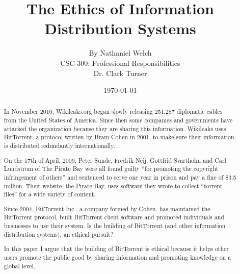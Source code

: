 \documentclass[11pt]{article}
\begin{document}
\title{\vfill The Ethics of Information Distribution Systems} %
\author{
By Nathaniel Welch\vspace{10pt}\\
CSC 300: Professional Responsibilities\vspace{10pt}\\
Dr. Clark Turner\vspace{10pt}\\
}
\date{\today}

\maketitle

\vfill
\begin{abstract}
In November 2010, Wikileaks.org began slowly releasing 251,287 diplomatic cables from the United States of America. \cite{cablegate} Since then some companies and governments have attacked the organization because they are sharing this information. Wikileaks uses BitTorrent, a protocol written by Bram Cohen in 2001, to make sure their information is distributed redundantly internationally.

On the 17th of April, 2009, Peter Sunde, Fredrik Neij, Gottfrid Svartholm and Carl Lundström of The Pirate Bay were all found guilty ``for promoting the copyright infringement of others'' and sentenced to serve one year in prison and pay a fine of \$3.5 million. \cite{tpbverdict} Their website, the Pirate Bay, uses software they wrote to collect ``torrent files'' for a wide variety of content.

Since 2004, BitTorrent Inc., a company formed by Cohen, has maintained the BitTorrent protocol, built BitTorrent client software and promoted individuals and businesses to use their system. Is the building of BitTorrent (and other information distribution systems), an ethical pursuit? 

In this paper I argue that the building of BitTorrent is ethical because it helps other users promote the public good by sharing information and promoting knowledge on a global level.
\end{abstract}

\thispagestyle{empty}
\newpage
\thispagestyle{empty}
\tableofcontents
\newpage

\end{document}
